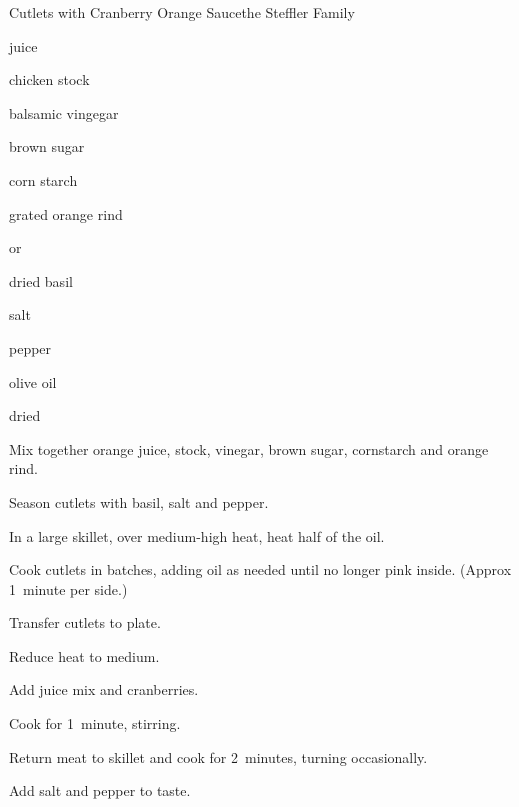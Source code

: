 \begin{recipe}{Cutlets with Cranberry Orange Sauce}{the Steffler Family}{}

\begin{ingredients}
\item \C{\third}  juice
\item \C{\third} chicken stock
\item {} balsamic vingegar
\item {} brown sugar
\item {} corn starch
\item {} grated orange rind
\item {}  or 
\item {} dried basil
\item \tp{\half} salt
\item \tp{\quarter} pepper
\item {} olive oil
\item \C{\quarter} dried 
\end{ingredients}

\begin{directions}
\item Mix together orange juice, stock, vinegar, brown sugar, cornstarch and orange rind.
\item Season cutlets with basil, salt and pepper.
\item In a large skillet, over medium-high heat, heat half of the oil.
\item Cook cutlets in batches, adding oil as needed until no longer pink inside. (Approx 1~minute per side.)
\item Transfer cutlets to plate.
\item Reduce heat to medium.
\item Add juice mix and cranberries.
\item Cook for 1~minute, stirring.
\item Return meat to skillet and cook for 2~minutes, turning occasionally.
\item Add salt and pepper to taste.
\end{directions}
\end{recipe}
